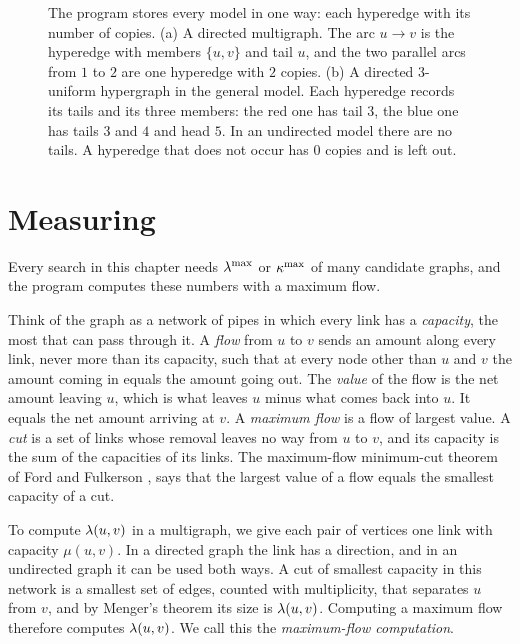 \begin{figure}[ht]
\caption{The program stores every model in one way: each hyperedge with its number of copies. (a) A directed multigraph. The arc $u\to v$ is the hyperedge with members $\{u,v\}$ and tail $u$, and the two parallel arcs from $1$ to $2$ are one hyperedge with $2$ copies. (b) A directed $3$-uniform hypergraph in the general model. Each hyperedge records its tails and its three members: the red one has tail $3$, the blue one has tails $3$ and $4$ and head $5$. In an undirected model there are no tails. A hyperedge that does not occur has $0$ copies and is left out.}
\label{fig:matrix-rep}
\end{figure}

\section{Measuring}
Every search in this chapter needs $\lambda^{\max}$ or $\kappa^{\max}$ of many candidate graphs, and the program computes these numbers with a maximum flow.

Think of the graph as a network of pipes in which every link has a \emph{capacity}, the most that can pass through it.
A \emph{flow} from $u$ to $v$ sends an amount along every link, never more than its capacity, such that at every node other than $u$ and $v$ the amount coming in equals the amount going out.
The \emph{value} of the flow is the net amount leaving $u$, which is what leaves $u$ minus what comes back into $u$. It equals the net amount arriving at $v$.
A \emph{maximum flow} is a flow of largest value.
A \emph{cut} is a set of links whose removal leaves no way from $u$ to $v$, and its capacity is the sum of the capacities of its links.
The maximum-flow minimum-cut theorem of Ford and Fulkerson \cite{FordFulkerson56}, \cite[Theorem~6.2.2]{Diestel25} says that the largest value of a flow equals the smallest capacity of a cut.

To compute $\lambda(u,v)$ in a multigraph, we give each pair of vertices one link with capacity $\mu(u,v)$. In a directed graph the link has a direction, and in an undirected graph it can be used both ways.
A cut of smallest capacity in this network is a smallest set of edges, counted with multiplicity, that separates $u$ from $v$, and by Menger's theorem its size is $\lambda(u,v)$.
Computing a maximum flow therefore computes $\lambda(u,v)$.
We call this the \emph{maximum-flow computation}.


